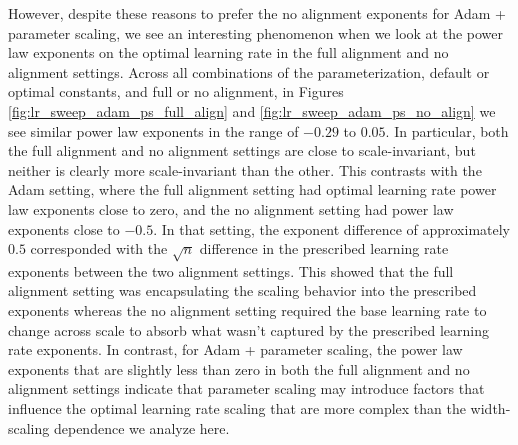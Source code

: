 \documentclass{article}
\theoremstyle{plain}
\theoremstyle{definition}
\theoremstyle{remark}
\begin{document}
However, despite these reasons to prefer the no alignment exponents for Adam + parameter scaling, we see an interesting phenomenon when we look at the power law exponents on the optimal learning rate in the full alignment and no alignment settings. Across all combinations of the parameterization, default or optimal constants, and full or no alignment, in Figures \ref{fig:lr_sweep_adam_ps_full_align} and \ref{fig:lr_sweep_adam_ps_no_align} we see similar power law exponents in the range of $-0.29$ to $0.05$. In particular, both the full alignment and no alignment settings are close to scale-invariant, but neither is clearly more scale-invariant than the other. This contrasts with the Adam setting, where the full alignment setting had optimal learning rate power law exponents close to zero, and the no alignment setting had power law exponents close to $-0.5$. In that setting, the exponent difference of approximately $0.5$ corresponded with the $\sqrt{n}$ difference in the prescribed learning rate exponents between the two alignment settings. This showed that the full alignment setting was encapsulating the scaling behavior into the prescribed exponents whereas the no alignment setting required the base learning rate to change across scale to absorb what wasn't captured by the prescribed learning rate exponents. In contrast, for Adam + parameter scaling, the power law exponents that are slightly less than zero in both the full alignment and no alignment settings indicate that parameter scaling may introduce factors that influence the optimal learning rate scaling that are more complex than the width-scaling dependence we analyze here.
\end{document}
